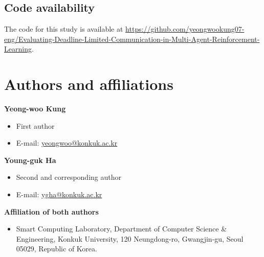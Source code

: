 \documentclass[pdflatex,sn-mathphys-num]{sn-jnl}
\begin{document}
\subsection*{Code availability}
The code for this study is available at \url{https://github.com/yeongwookung07-eng/Evaluating-Deadline-Limited-Communication-in-Multi-Agent-Reinforcement-Learning}.
\setlength{\bibsep}{0.5pt}

\par
\section*{Authors and affiliations}
\textbf{Yeong-woo Kung}
\begin{itemize}
\setlength{\itemsep}{0pt}\setlength{\parsep}{0pt}
\item First author
\item E-mail: \href{mailto:yeongwoo@konkuk.ac.kr}{yeongwoo@konkuk.ac.kr}
\end{itemize}
\textbf{Young-guk Ha}
\begin{itemize}
\setlength{\itemsep}{0pt}\setlength{\parsep}{0pt}
\item Second and corresponding author
\item E-mail: \href{mailto:ygha@konkuk.ac.kr}{ygha@konkuk.ac.kr}
\end{itemize}
\textbf{Affiliation of both authors}
\begin{itemize}
\setlength{\itemsep}{0pt}\setlength{\parsep}{0pt}
\item Smart Computing Laboratory, Department of Computer Science \& Engineering, Konkuk University, 120 Neungdong-ro, Gwangjin-gu, Seoul 05029, Republic of Korea.
\end{itemize}
\end{document}
